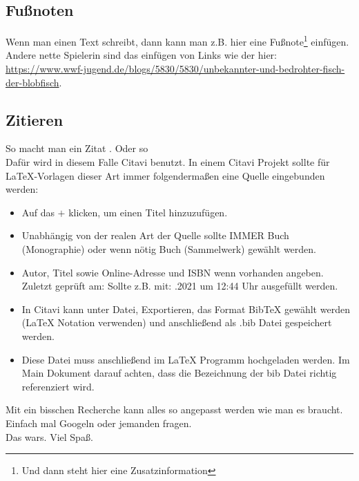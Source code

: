 \subsection{Fußnoten}
\label{subsec_Fußnoten}
Wenn man einen Text schreibt, dann kann man z.B. hier eine Fußnote\footnote{Und dann steht hier eine Zusatzinformation} einfügen. Andere nette Spielerin sind das einfügen von Links wie der hier: \url{https://www.wwf-jugend.de/blogs/5830/5830/unbekannter-und-bedrohter-fisch-der-blobfisch}.


\subsection{Zitieren}
\label{subsec_Zitieren}

So macht man ein Zitat \cite{Follinger.2016}. Oder so \cite{ifmelectronic.2004}\\
Dafür wird in diesem Falle Citavi benutzt. In einem Citavi Projekt sollte für LaTeX-Vorlagen dieser Art immer folgendermaßen eine Quelle eingebunden werden:
\begin{itemize}
    \item Auf das $+$ klicken, um einen Titel hinzuzufügen.
    \item Unabhängig von der realen Art der Quelle sollte IMMER \glqq Buch (Monographie)\grqq{} oder wenn nötig \glqq Buch (Sammelwerk)\grqq{} gewählt werden.
    \item Autor, Titel sowie Online-Adresse und ISBN wenn vorhanden angeben. Zuletzt geprüft am: Sollte z.B. mit: .2021 um 12:44 Uhr\grqq{} ausgefüllt werden.
    \item In Citavi kann unter Datei, Exportieren, das Format \glqq BibTeX\grqq{} gewählt werden (LaTeX Notation verwenden) und anschließend als .bib Datei gespeichert werden.
    \item Diese Datei muss anschließend im LaTeX Programm hochgeladen werden. Im Main Dokument darauf achten, dass die Bezeichnung der bib Datei richtig referenziert wird.
\end{itemize}
Mit ein bisschen Recherche kann alles so angepasst werden wie man es braucht. Einfach mal Googeln oder jemanden fragen.\\
Das wars. Viel Spaß.
